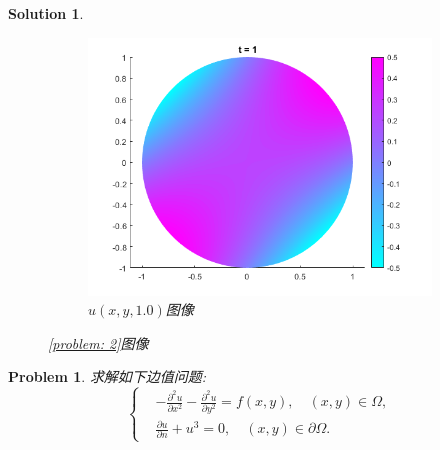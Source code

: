 \documentclass[a4paper, 12pt]{ctexart}
\theoremstyle{plain}
\newtheorem{problem}{Problem}[section]
\theoremstyle{plain}
\theoremstyle{plain}
\theoremstyle{nonumberplain}
\newtheorem{solution}{Solution}
\begin{document}
\begin{solution}
\begin{figure}[H]
\begin{subfigure}[b]{0.30\textwidth}
                \includegraphics[width=\textwidth]{wc27.png}
                \caption{$u(x,y,1.0)$图像}
            \end{subfigure}
            \caption{\ref{problem: 2}图像}
        \end{figure}
    \end{solution}

    \begin{problem}
        \label{problem: 3}
        求解如下边值问题:
        \begin{equation}
            \left\{
            \begin{aligned}
                &-\frac{\partial^{2}u}{\partial x^{2}}-\frac{\partial^{2}u}{\partial y^{2}}=f(x,y),\quad (x,y)\in \Omega,\\
                &\frac{\partial u}{\partial n}+u^{3}=0,\quad (x,y)\in\partial\Omega.
            \end{aligned}
            \right.
        \end{equation}
    \end{problem}
\end{document}
